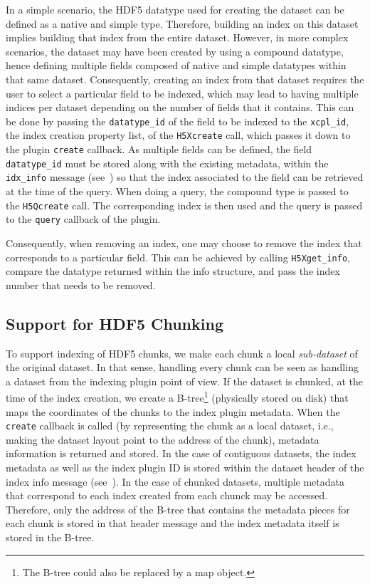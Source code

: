 \documentclass[letterpaper,hyper]{THG_RFC}
\begin{document}
In a simple scenario, the HDF5 datatype used for creating the dataset can be defined
as a native and simple type. Therefore, building an index on this dataset implies
building that index from the entire dataset. However, in more complex scenarios, the
dataset may have been created by using a compound datatype, hence defining
multiple fields composed of native and simple datatypes within that same dataset.
Consequently, creating an index from that dataset requires the user to select a
particular field to be indexed, which may lead to having multiple indices per dataset
depending on the number of fields that it contains. This can be done by passing
the \texttt{datatype\_id} of the field to be indexed to the \texttt{xcpl\_id},
the index creation property list, of the \texttt{H5Xcreate} call, which passes
it down to the plugin \texttt{create} callback. As multiple fields can be defined,
the field \texttt{datatype\_id} must be stored along with the existing metadata, within the
\texttt{idx\_info} message (see~) so that the index
associated to the field can be retrieved at the time of the query.
When doing a query, the compound type is passed to the \texttt{H5Qcreate} call.
The corresponding index is then used and the query is passed to the \texttt{query}
callback of the plugin.

Consequently, when removing an index, one may choose to remove the index that
corresponds to a particular field. This can be achieved by calling \texttt{H5Xget\_info},
compare the datatype returned within the info structure, and pass the index number
that needs to be removed.

\subsection{Support for HDF5 Chunking}

To support indexing of HDF5 chunks, we make each chunk a local \textit{sub-dataset}
of the original dataset. In that sense, handling every chunk can be seen as handling
a dataset from the indexing plugin point of view. If the dataset is chunked,
at the time of the index creation, we create a B-tree\footnote{The B-tree could also
be replaced by a map object.} (physically
stored on disk) that maps the coordinates of the chunks to the index plugin metadata.
When the \texttt{create} callback is called (by representing the chunk as
a local dataset, i.e., making the dataset layout point to the address of the chunk),
metadata information is returned and stored.
In the case of contiguous datasets, the index metadata as well as the index plugin ID is
stored within the dataset header of the index info message (see~).
In the case of chunked datasets, multiple metadata that correspond to each index created
from each chunck may be accessed. Therefore, only the address of the B-tree that contains the 
metadata pieces for each chunk is stored in that header message and the index
metadata itself is stored in the B-tree.
\end{document}
